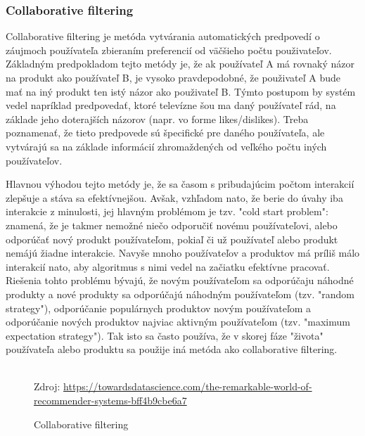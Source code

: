 \subsubsection{Collaborative filtering}
Collaborative filtering je metóda vytvárania automatických predpovedí o záujmoch používateľa zbieraním preferencií od väčšieho počtu použivateľov. Základným predpokladom tejto metódy je, že ak používateľ A má rovnaký názor na produkt ako používateľ B, je vysoko pravdepodobné, že použivateľ A bude mať na iný produkt ten istý názor ako použivateľ B. Týmto postupom by systém vedel napríklad predpovedať, ktoré televízne šou ma daný používateľ rád, na základe jeho doterajších názorov (napr. vo forme likes/dislikes). Treba poznamenať, že tieto predpovede sú špecifické pre daného používateľa, ale vytvárajú sa na základe informácií zhromaždených od veľkého počtu iných používateľov. 

Hlavnou výhodou tejto metódy je, že sa časom s pribudajúcim počtom interakcií zlepšuje a stáva sa efektívnejšou. Avšak, vzhľadom nato, že berie do úvahy iba interakcie z minulosti, jej hlavným problémom je tzv. "cold start problem": znamená, že je takmer nemožné niečo odporučiť novému používateľovi, alebo odporúčať nový produkt používateľom, pokiaľ či už používateľ alebo produkt nemájú žiadne interakcie. Navyše mnoho používateľov a produktov má príliš málo interakcií nato, aby algoritmus s nimi vedel na začiatku efektívne pracovať. Riešenia tohto problému bývajú, že novým používateľom sa odporúčaju náhodné produkty a nové produkty sa odporúčajú náhodným používateľom (tzv. "random strategy"), odporúčanie populárnych produktov novým používateľom a odporúčanie nových produktov najviac aktivným používateľom (tzv. "maximum expectation strategy"). Tak isto sa často používa, že v skorej fáze "života" používateľa alebo produktu sa použije iná metóda ako collaborative filtering. \\\\

\begin{figure}[!htbp]
  \centering  
  \def\stackalignment{c}
           {\scriptsize%
            Zdroj: \url{https://towardsdatascience.com/the-remarkable-world-of-recommender-systems-bff4b9cbe6a7}}
  \caption{Collaborative filtering}
  
  \label{collaborativeFiltering}
\end{figure}

